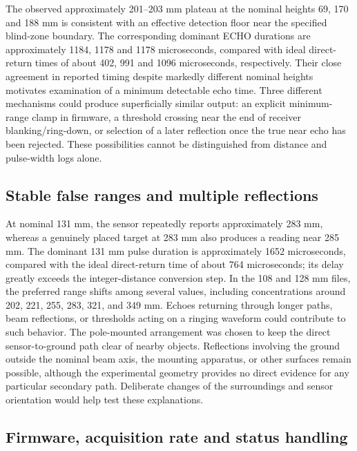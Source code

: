 \documentclass[11pt,a4paper]{article}
\begin{document}
The observed approximately 201–203 mm plateau at the nominal heights 69, 170 and 188 mm is consistent with an effective detection floor near the specified blind-zone boundary. The corresponding dominant ECHO durations are approximately 1184, 1178 and 1178 microseconds, compared with ideal direct-return times of about 402, 991 and 1096 microseconds, respectively. Their close agreement in reported timing despite markedly different nominal heights motivates examination of a minimum detectable echo time. Three different mechanisms could produce superficially similar output: an explicit minimum-range clamp in firmware, a threshold crossing near the end of receiver blanking/ring-down, or selection of a later reflection once the true near echo has been rejected. These possibilities cannot be distinguished from distance and pulse-width logs alone.
\subsection{Stable false ranges and multiple reflections}
\label{sec:org9f4d308}
At nominal 131 mm, the sensor repeatedly reports approximately 283 mm, whereas a genuinely placed target at 283 mm also produces a reading near 285 mm. The dominant 131 mm pulse duration is approximately 1652 microseconds, compared with the ideal direct-return time of about 764 microseconds; its delay greatly exceeds the integer-distance conversion step. In the 108 and 128 mm files, the preferred range shifts among several values, including concentrations around 202, 221, 255, 283, 321, and 349 mm. Echoes returning through longer paths, beam reflections, or thresholds acting on a ringing waveform could contribute to such behavior. The pole-mounted arrangement was chosen to keep the direct sensor-to-ground path clear of nearby objects. Reflections involving the ground outside the nominal beam axis, the mounting apparatus, or other surfaces remain possible, although the experimental geometry provides no direct evidence for any particular secondary path. Deliberate changes of the surroundings and sensor orientation would help test these explanations.
\subsection{Firmware, acquisition rate and status handling}
\label{sec:orge4b379e}
\end{document}
